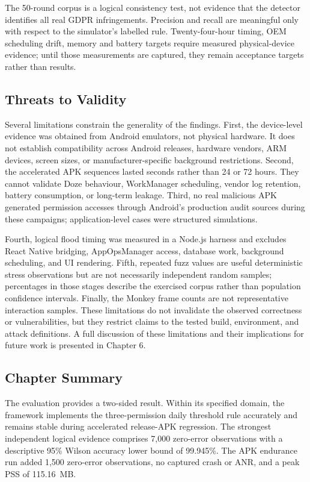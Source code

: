 The 50-round corpus is a logical consistency test, not evidence that the detector identifies all real GDPR infringements. Precision and recall are meaningful only with respect to the simulator's labelled rule. Twenty-four-hour timing, OEM scheduling drift, memory and battery targets require measured physical-device evidence; until those measurements are captured, they remain acceptance targets rather than results.

\subsection{Threats to Validity}

Several limitations constrain the generality of the findings. First, the device-level evidence was obtained from Android emulators, not physical hardware. It does not establish compatibility across Android releases, hardware vendors, ARM devices, screen sizes, or manufacturer-specific background restrictions. Second, the accelerated APK sequences lasted seconds rather than 24 or 72 hours. They cannot validate Doze behaviour, WorkManager scheduling, vendor log retention, battery consumption, or long-term leakage. Third, no real malicious APK generated permission accesses through Android's production audit sources during these campaigns; application-level cases were structured simulations.

Fourth, logical flood timing was measured in a Node.js harness and excludes React Native bridging, AppOpsManager access, database work, background scheduling, and UI rendering. Fifth, repeated fuzz values are useful deterministic stress observations but are not necessarily independent random samples; percentages in those stages describe the exercised corpus rather than population confidence intervals. Finally, the Monkey frame counts are not representative interaction samples. These limitations do not invalidate the observed correctness or vulnerabilities, but they restrict claims to the tested build, environment, and attack definitions. A full discussion of these limitations and their implications for future work is presented in Chapter 6.

\subsection{Chapter Summary}

The evaluation provides a two-sided result. Within its specified domain, the framework implements the three-permission daily threshold rule accurately and remains stable during accelerated release-APK regression. The strongest independent logical evidence comprises 7,000 zero-error observations with a descriptive 95\% Wilson accuracy lower bound of 99.945\%. The APK endurance run added 1,500 zero-error observations, no captured crash or ANR, and a peak PSS of 115.16~MB.

